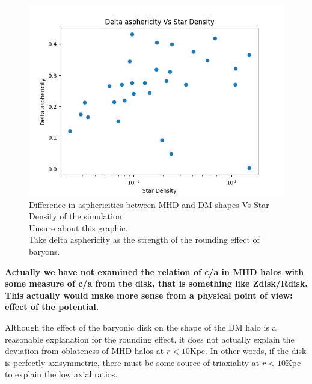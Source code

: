 \documentclass[a4paper,fleqn,usenatbib]{mnras}
\begin{document}
\begin{figure}
	\includegraphics[width=\columnwidth]{./pics/Delta asphericity Vs Star Density.png}
    \caption{Difference in asphericities between MHD and DM shapes Vs Star Density of the simulation.\\
    Unsure about this graphic.\\
    Take delta asphericity as the strength of the rounding effect of baryons.}
    \label{fig:Star_Density_effect}
\end{figure}

\textbf{Actually we have not examined the relation of c/a in MHD halos
  with some measure of c/a from the disk, that is something like
  Zdisk/Rdisk. This actually would make more sense from a physical
  point of view: effect of the potential.} 

Although the effect of the baryonic disk on the shape of the DM halo
is a reasonable explanation for the rounding effect, it does not
actually explain the deviation from oblateness of MHD halos at
$r<10$Kpc. In other words, if the disk is perfectly axisymmetric,
there must be some source of triaxiality at $r<10$Kpc to explain the
low axial ratios. 
\end{document}
